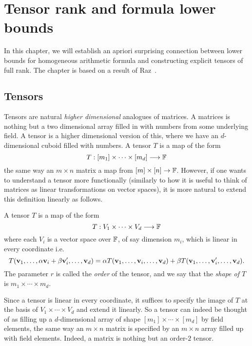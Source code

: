 \chapter{Tensor rank and formula lower bounds}\label{chap:tensorrk}

In this chapter, we will establish an apriori surprising connection between lower bounds for homogeneous arithmetic formula and constructing explicit tensors of full rank.
The chapter is based on a result of Raz~\cite{raz10}.

\section{Tensors}

Tensors are natural \emph{higher dimensional} analogues of matrices.
A matrices is nothing but a two dimensional array filled in with numbers from some underlying field.
A tensor is a higher dimensional version of this, where we have an $d$-dimensional cuboid filled with numbers.
A tensor $T$ is a map of the form
\[
T: [m_1] \times \cdots \times [m_d] \longrightarrow \mathbb{F}
\]
the same way an $m\times n$ matrix a map from $[m] \times [n] \rightarrow \mathbb{F}$.
However, if one wants to understand a tensor more functionally (similarly to how it is useful to think of matrices as linear transformations on vector spaces), it is more natural to extend this definition linearly as follows.

\begin{definition}[Tensor]\label{defn:tensor}
A tensor $T$ is a map of the form 
\[
T: V_1 \times \cdots \times V_d \longrightarrow \mathbb{F}
\]
where each $V_i$ is a vector space over $\mathbb{F}$, of say dimension $m_i$, which is linear in every coordinate i.e.
\[
T(\mathbf{v}_1, \ldots,\alpha\mathbf{v}_i + \beta\mathbf{v}_i', \ldots, \mathbf{v}_d) = \alpha T(\mathbf{v}_1, \ldots,\mathbf{v}_i, \ldots, \mathbf{v}_d) + \beta T(\mathbf{v}_1, \ldots,\mathbf{v}_i', \ldots, \mathbf{v}_d).
\]
The parameter $r$ is called the \emph{order} of the tensor, and we say that the \emph{shape of $T$} is $m_1 \times \cdots \times m_d$. 
\end{definition}
Since a tensor is linear in every coordinate, it suffices to specify the image of $T$ at the basis of $V_1 \times \cdots \times V_d$ and extend it linearly.
So a tensor can indeed be thought of as filling up a $d$-dimensional array of shape $[m_1]\times \cdots \times [m_d]$ by field elements, the same way an $m\times n$ matrix is specified by an $m\times n$ array filled up with field elements.
Indeed, a matrix is nothing but an order-$2$ tensor.

